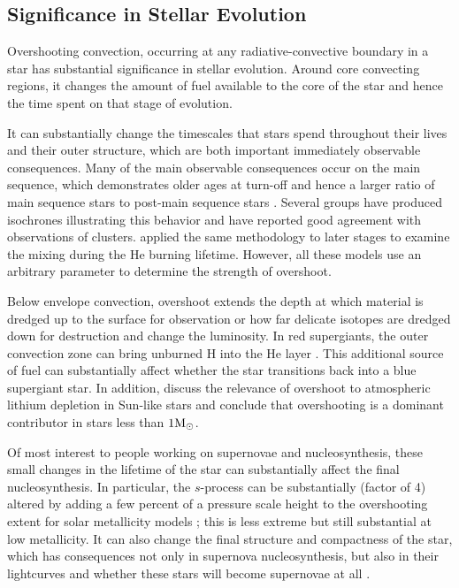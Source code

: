 
\subsection{Significance in Stellar Evolution} %
\label{sub:intro:osht:significance}

	Overshooting convection, occurring at any radiative-convective boundary in a star has substantial significance in stellar evolution.
		Around core convecting regions, it changes the amount of fuel available to the core of the star and hence the time spent on that stage of evolution.
		
		It can substantially change the timescales that stars spend throughout their lives and their outer structure, which are both important immediately observable consequences.
			Many of the main observable consequences occur on the main sequence, which demonstrates older ages at turn-off and hence a larger ratio of main sequence stars to post-main sequence stars \citep{Maeder1989}.
			Several groups have produced isochrones illustrating this behavior \citep[e.g.][]{Bertelli1990} and have reported good agreement with observations of clusters.
			\citet{Buonanno1985} applied the same methodology to later stages to examine the mixing during the He burning lifetime.
			However, all these models use an arbitrary parameter to determine the strength of overshoot.
			
		Below envelope convection, overshoot extends the depth at which material is dredged up to the surface for observation or how far delicate isotopes are dredged down for destruction and change the luminosity.
			In red supergiants, the outer convection zone can bring unburned H into the He layer \citet{Stothers1991}.
			This additional source of fuel can substantially affect whether the star transitions back into a blue supergiant star.
			In addition, \citet{Xiong2009} discuss the relevance of overshoot to atmospheric lithium depletion in Sun-like stars and conclude that overshooting is a dominant contributor in stars less than $1 \mbox{M$_\odot$}$.
			
		Of most interest to people working on supernovae and nucleosynthesis, these small changes in the lifetime of the star can substantially affect the final nucleosynthesis.
			In particular, the $s$-process can be substantially (factor of 4) altered by adding a few percent of a pressure scale height to the overshooting extent for solar metallicity models \citep{Pumo2011}; this is less extreme but still substantial at low metallicity.
			It can also change the final structure and compactness of the star, which has consequences not only in supernova nucleosynthesis, but also in their lightcurves and whether these stars will become supernovae at all \citep{Sukhbold2014}.

